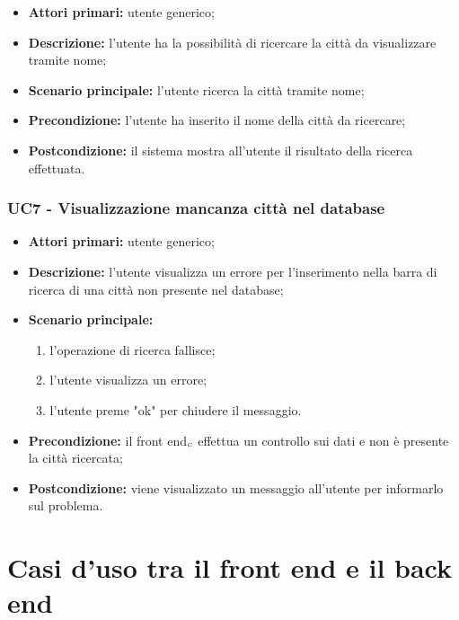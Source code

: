 \begin{itemize}
	\item \textbf{Attori primari:} utente generico;
	\item \textbf{Descrizione:} l’utente ha la possibilità di ricercare la città da visualizzare tramite nome;
	\item \textbf{Scenario principale:} l’utente ricerca la città tramite nome;
	\item \textbf{Precondizione:} l’utente ha inserito il nome della città da ricercare;
	\item \textbf{Postcondizione:} il sistema mostra all’utente il risultato della ricerca effettuata.
\end{itemize}

\subsubsection{UC7 - Visualizzazione mancanza città nel database}\label{CasiDUsoCasiDUsoTraUnUtenteEIlFrontEndElencoCasiDUsoUC7VisualizzazioneMessaggioDiMancanzaCittàNelDatabase}

\begin{itemize}
	\item \textbf{Attori primari:} utente generico;
	\item \textbf{Descrizione:} l’utente visualizza un errore per l'inserimento nella barra di ricerca di una città non presente nel database;
	\item \textbf{Scenario principale:}
	\begin{enumerate}
		\item l’operazione di ricerca fallisce;
		\item l’utente visualizza un errore;
		\item l’utente preme "ok" per chiudere il messaggio.
	\end{enumerate}
	\item \textbf{Precondizione:} il front end$_{\scaleto{G}{3pt}}$ effettua un controllo sui dati e non è presente la città ricercata;
	\item \textbf{Postcondizione:} viene visualizzato  un messaggio all’utente per informarlo sul problema.
\end{itemize}

\section{Casi d'uso tra il front end e il back end}\label{CasiDUsoCasiDUsoTraIlFrontEndEIlBackEnd}

